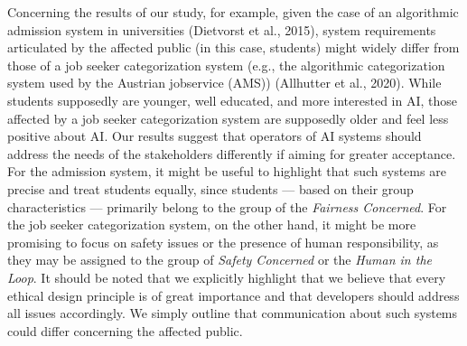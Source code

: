 \documentclass{article}
\begin{document}
Concerning the results of our study, for example, given the case of an
algorithmic admission system in universities (Dietvorst et al., 2015),
system requirements articulated by the affected public (in this case,
students) might widely differ from those of a job seeker categorization
system (e.g., the algorithmic categorization system used by the Austrian
jobservice (AMS)) (Allhutter et al., 2020). While students supposedly
are younger, well educated, and more interested in AI, those affected by
a job seeker categorization system are supposedly older and feel less
positive about AI. Our results suggest that operators of AI systems
should address the needs of the stakeholders differently if aiming for
greater acceptance. For the admission system, it might be useful to
highlight that such systems are precise and treat students equally,
since students --- based on their group characteristics --- primarily
belong to the group of the \emph{Fairness Concerned}. For the job seeker
categorization system, on the other hand, it might be more promising to
focus on safety issues or the presence of human responsibility, as they
may be assigned to the group of \emph{Safety Concerned} or the
\emph{Human in the Loop}. It should be noted that we explicitly
highlight that we believe that every ethical design principle is of
great importance and that developers should address all issues
accordingly. We simply outline that communication about such systems
could differ concerning the affected public.
\end{document}
